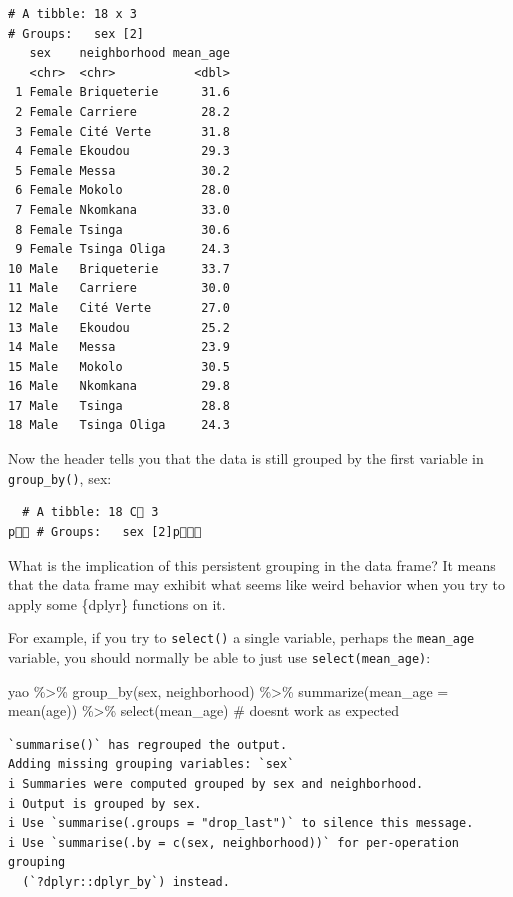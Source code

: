 \documentclass[
  letterpaper,
  DIV=11,
  numbers=noendperiod]{scrreprt}
\newenvironment{Shaded}{\begin{snugshade}}{\end{snugshade}}
\newcommand{\AttributeTok}[1]{\textcolor[rgb]{0.40,0.45,0.13}{#1}}
\newcommand{\CommentTok}[1]{\textcolor[rgb]{0.37,0.37,0.37}{#1}}
\newcommand{\FunctionTok}[1]{\textcolor[rgb]{0.28,0.35,0.67}{#1}}
\newcommand{\NormalTok}[1]{\textcolor[rgb]{0.00,0.23,0.31}{#1}}
\newcommand{\SpecialCharTok}[1]{\textcolor[rgb]{0.37,0.37,0.37}{#1}}
\begin{document}
\begin{verbatim}
# A tibble: 18 x 3
# Groups:   sex [2]
   sex    neighborhood mean_age
   <chr>  <chr>           <dbl>
 1 Female Briqueterie      31.6
 2 Female Carriere         28.2
 3 Female Cité Verte       31.8
 4 Female Ekoudou          29.3
 5 Female Messa            30.2
 6 Female Mokolo           28.0
 7 Female Nkomkana         33.0
 8 Female Tsinga           30.6
 9 Female Tsinga Oliga     24.3
10 Male   Briqueterie      33.7
11 Male   Carriere         30.0
12 Male   Cité Verte       27.0
13 Male   Ekoudou          25.2
14 Male   Messa            23.9
15 Male   Mokolo           30.5
16 Male   Nkomkana         29.8
17 Male   Tsinga           28.8
18 Male   Tsinga Oliga     24.3
\end{verbatim}

Now the header tells you that the data is still grouped by the first
variable in \texttt{group\_by()}, sex:

\begin{verbatim}
  # A tibble: 18 C 3
p # Groups:   sex [2]p
\end{verbatim}

What is the implication of this persistent grouping in the data frame?
It means that the data frame may exhibit what seems like weird behavior
when you try to apply some \{dplyr\} functions on it.

For example, if you try to \texttt{select()} a single variable, perhaps
the \texttt{mean\_age} variable, you should normally be able to just use
\texttt{select(mean\_age)}:

\begin{Shaded}
\begin{Highlighting}[]
\NormalTok{yao }\SpecialCharTok{\%\textgreater{}\%} 
  \FunctionTok{group\_by}\NormalTok{(sex, neighborhood) }\SpecialCharTok{\%\textgreater{}\%} 
  \FunctionTok{summarize}\NormalTok{(}\AttributeTok{mean\_age =} \FunctionTok{mean}\NormalTok{(age)) }\SpecialCharTok{\%\textgreater{}\%} 
  \FunctionTok{select}\NormalTok{(mean\_age) }\CommentTok{\# doesn\textquotesingle{}t work as expected }
\end{Highlighting}
\end{Shaded}

\begin{verbatim}
`summarise()` has regrouped the output.
Adding missing grouping variables: `sex`
i Summaries were computed grouped by sex and neighborhood.
i Output is grouped by sex.
i Use `summarise(.groups = "drop_last")` to silence this message.
i Use `summarise(.by = c(sex, neighborhood))` for per-operation grouping
  (`?dplyr::dplyr_by`) instead.
\end{verbatim}
\end{document}
